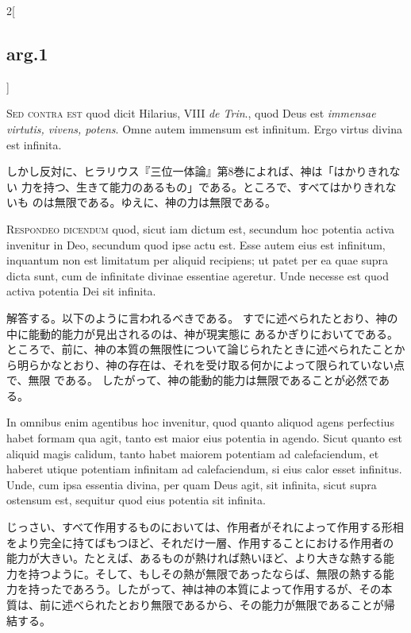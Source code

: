 \documentclass[paper=a4paper,fontsize=10pt,jafontsize=9pt,titlepage]{jlreq}
\begin{document}
\begin{paracol}{2}[\subsection{arg.1}]
\switchcolumn*[\subsection{s.c.}]

{\scshape Sed contra est} quod dicit Hilarius, VIII {\itshape de Trin}.,
 quod Deus est {\itshape immensae virtutis, vivens, potens}. Omne autem
 immensum est infinitum. Ergo virtus divina est infinita.

\switchcolumn

しかし反対に、ヒラリウス『三位一体論』第8巻によれば、神は「はかりきれない
 力を持つ、生きて能力のあるもの」である。ところで、すべてはかりきれないも
 のは無限である。ゆえに、神の力は無限である。


{\scshape Respondeo dicendum} quod, sicut iam dictum est, secundum hoc
 potentia activa invenitur in Deo, secundum quod ipse actu est. Esse
 autem eius est infinitum, inquantum non est limitatum per aliquid
 recipiens; ut patet per ea quae supra dicta sunt, cum de infinitate
 divinae essentiae ageretur. Unde necesse est quod activa potentia Dei
 sit infinita.

\switchcolumn

解答する。以下のように言われるべきである。
すでに述べられたとおり、神の中に能動的能力が見出されるのは、神が現実態に
 あるかぎりにおいてである。
ところで、前に、神の本質の無限性について論じられたときに述べられたことから明らかなとおり、神の存在は、それを受け取る何かによって限られていない点で、無限
 である。
したがって、神の能動的能力は無限であることが必然である。

\switchcolumn*

In omnibus enim agentibus hoc invenitur, quod quanto
 aliquod agens perfectius habet formam qua agit, tanto est maior eius
 potentia in agendo. Sicut quanto est aliquid magis calidum, tanto habet
 maiorem potentiam ad calefaciendum, et haberet utique potentiam
 infinitam ad calefaciendum, si eius calor esset infinitus. Unde, cum
 ipsa essentia divina, per quam Deus agit, sit infinita, sicut supra
 ostensum est, sequitur quod eius potentia sit infinita.

\switchcolumn

じっさい、すべて作用するものにおいては、作用者がそれによって作用する形相
 をより完全に持てばもつほど、それだけ一層、作用することにおける作用者の
 能力が大きい。たとえば、あるものが熱ければ熱いほど、より大きな熱する能
 力を持つように。そして、もしその熱が無限であったならば、無限の熱する能
 力を持ったであろう。したがって、神は神の本質によって作用するが、その本
 質は、前に述べられたとおり無限であるから、その能力が無限であることが帰
 結する。


\end{paracol}
\end{document}
